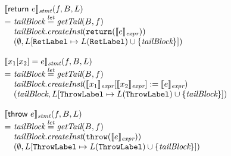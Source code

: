 \[\begin{array}{l@{}l@{~}l}
\lefteqn{\transfun{\ircfgreturn{e}}_{\emph{stmt}}(f, B, L)}\\
& = & \emph{tailBlock} \letval \getTail(B, f)\\
& & \emph{tailBlock}.\emph{createInst}(\TT{return}(\transfun{e}_{\emph{expr}}))\\
& & (\emptyset, L[\RetLabel \mapsto L(\RetLabel) \cup \{ \emph{tailBlock}\}])\\
& & \\

\lefteqn{\transfun{\irstore{x_1}{x_2}{e}}_{\emph{stmt}}(f, B, L)}\\
& = & \emph{tailBlock} \letval \getTail(B, f)\\
& & \emph{tailBlock}.\emph{createInst}(\transfun{x_1}_{\emph{expr}}[\transfun{x_2}_{\emph{expr}}] := \transfun{e}_{\emph{expr}})\\
& & (\emph{tailBlock}, L[\ThrowLabel \mapsto L(\ThrowLabel) \cup \{ \emph{tailBlock} \}])\\
& & \\

\lefteqn{\transfun{\irthrow{e}}_{\emph{stmt}}(f, B, L)}\\
& = & \emph{tailBlock} \letval \getTail(B, f)\\
& & \emph{tailBlock}.\emph{createInst}(\TT{throw}(\transfun{e}_{\emph{expr}}))\\
& & (\emptyset, L[\ThrowLabel \mapsto L(\ThrowLabel) \cup \{ \emph{tailBlock} \}])\\

\end{array}
\]

